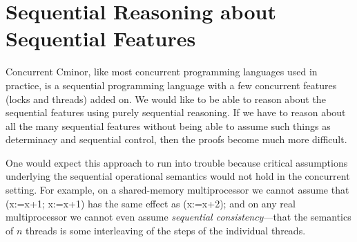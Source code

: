\documentclass{llncs}
\newcommand{\cminor}{Cminor}
\begin{document}
\section{Sequential Reasoning about Sequential Features}

Concurrent \cminor, like most concurrent programming languages
used in practice, is a sequential programming language
with a few concurrent features (locks and threads)
added on.  We would like to be able to reason about the sequential
features using purely sequential reasoning.   If we have to
reason about all the many sequential features without being
able to assume such things as determinacy and sequential control, then
the proofs become much more difficult.

One would expect this approach to run into trouble because
critical assumptions underlying the sequential operational
semantics would not hold in the concurrent setting.
For example, on a shared-memory multiprocessor we cannot
assume that (x:=x+1; x:=x+1) has the same effect as
(x:=x+2); and on any real multiprocessor 
we cannot even assume \emph{sequential consistency}---that the
semantics of $n$ threads is some interleaving of the steps
of the individual threads.
\end{document}
